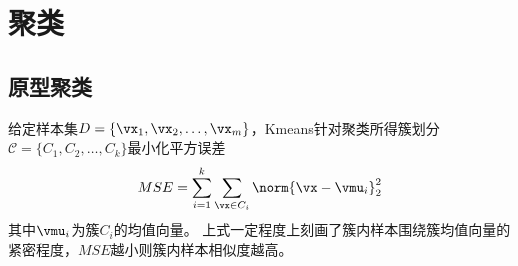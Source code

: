 
\section{聚类}
\subsection{原型聚类}
给定样本集$D=\{\vx_1,\vx_2,\ldots,\vx_m\}$，Kmeans针对聚类所得簇划分$\mathcal{C}=\{C_1,C_2,\ldots,C_k\}$最小化平方误差
\[MSE=\sum_{i=1}^k\sum_{\vx\in C_i}\norm{\vx-\vmu_i}_2^2\]
其中$\vmu_i$为簇$C_i$的均值向量。
上式一定程度上刻画了簇内样本围绕簇均值向量的紧密程度，$MSE$越小则簇内样本相似度越高。